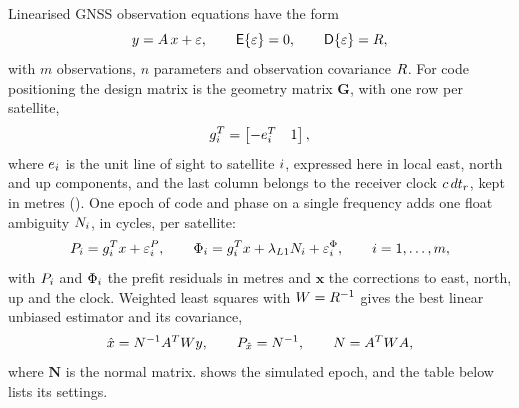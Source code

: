 \documentclass[main.tex]{subfiles}
\begin{document}
Linearised GNSS observation equations have the form
\begin{equation}
y = A\,x + \varepsilon,
\qquad
\mathsf{E}\{\varepsilon\} = 0,
\qquad
\mathsf{D}\{\varepsilon\} = R,
\label{eq:la-gmm}
\end{equation}
with $m$ observations, $n$ parameters and observation covariance $R$.
For code positioning the design matrix is the geometry matrix $\bm{G}$, with
one row per satellite,
\begin{equation}
g_i^{T} = \begin{bmatrix} -e_i^{T} & 1 \end{bmatrix},
\label{eq:la-grow}
\end{equation}
where $e_i$ is the unit line of sight to satellite $i$, expressed
here in local east, north and up components, and the last column belongs to
the receiver clock $c\,dt_r$, kept in metres
().  One epoch of code and phase on a single frequency adds one
float ambiguity $N_i$, in cycles, per satellite:
\begin{equation}
P_i = g_i^{T}x + \varepsilon^P_i,
\qquad
\Phi_i = g_i^{T}x + \lambda_{L1} N_i
               + \varepsilon^\Phi_i,
\qquad i = 1,\dots,m,
\label{eq:la-single-epoch}
\end{equation}
with $P_i$ and $\Phi_i$ the prefit residuals in metres and
$\bm{x}$ the corrections to east, north, up and the clock.  Weighted least
squares with $W = R^{-1}$ gives the best linear unbiased estimator
and its covariance,
\begin{equation}
\hat{x} = N^{-1}A^{T}Wy,
\qquad
P_{\hat x} = N^{-1},
\qquad
N = A^{T}WA,
\label{eq:la-wls}
\end{equation}
where $\bm{N}$ is the normal matrix.   shows the
simulated epoch, and the table below lists its settings.
\end{document}
